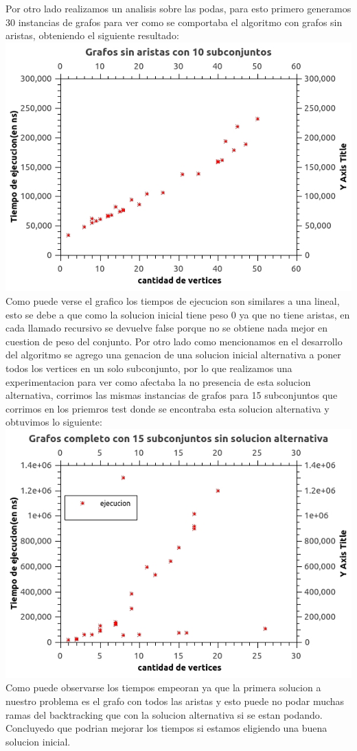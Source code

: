 Por otro lado realizamos un analisis sobre las podas, para esto primero generamos 30 instancias de grafos para ver como se comportaba el algoritmo con grafos sin aristas, obteniendo el siguiente resultado:\\
\includegraphics[scale=0.5]{Ej2/sinAristas.jpg}\\
Como puede verse el grafico los tiempos de ejecucion son similares a una lineal, esto se debe a que como la solucion inicial tiene peso 0 ya que no tiene aristas, en cada llamado recursivo se devuelve false porque no se obtiene nada mejor en cuestion de peso del conjunto.
Por otro lado como mencionamos en el desarrollo del algoritmo se agrego una genacion de una solucion inicial alternativa a poner todos los vertices en un solo subconjunto, por lo que realizamos una experimentacion para ver como afectaba la no presencia de esta solucion alternativa, corrimos las mismas instancias de grafos para 15 subconjuntos que corrimos en los priemros test donde se encontraba esta solucion alternativa y obtuvimos lo siguiente:\\
\includegraphics[scale=0.5]{Ej2/sinAlternativa.jpg}\\

Como puede observarse los tiempos empeoran ya que la primera solucion a nuestro problema es el grafo con todos las aristas y esto puede no podar muchas ramas del backtracking que con la solucion alternativa si se estan podando. Concluyedo que podrian mejorar los tiempos si estamos eligiendo una buena solucion inicial.


